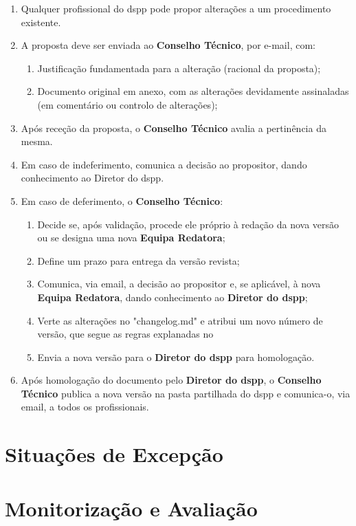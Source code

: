 \begin{enumerate}
  \item Qualquer profissional do \gls{dspp} pode propor alterações a um procedimento existente.
  \item A proposta deve ser enviada ao \textbf{Conselho Técnico}, por e-mail, com:
  \begin{enumerate}
    \item Justificação fundamentada para a alteração (racional da proposta);
    \item Documento original em anexo, com as alterações devidamente assinaladas (em comentário ou controlo de alterações);
  \end{enumerate}
  \item Após receção da proposta, o \textbf{Conselho Técnico} avalia a pertinência da mesma.
  \item Em caso de indeferimento, comunica a decisão ao propositor, dando conhecimento ao Diretor do \gls{dspp}.
  \item Em caso de deferimento, o \textbf{Conselho Técnico}:
  \begin{enumerate}
    \item Decide se, após validação, procede ele próprio à redação da nova versão ou se designa uma nova \textbf{Equipa Redatora};
    \item Define um prazo para entrega da versão revista;
    \item Comunica, via email, a decisão ao propositor e, se aplicável, à nova \textbf{Equipa Redatora}, dando conhecimento ao \textbf{Diretor do \gls{dspp}};
    \item Verte as alterações no "changelog.md" e atribui um novo número de versão, que segue as regras explanadas no 
    \item Envia a nova versão para o \textbf{Diretor do \gls{dspp}} para homologação.
  \end{enumerate}
  \item Após homologação do documento pelo \textbf{Diretor do \gls{dspp}}, o \textbf{Conselho Técnico} publica a nova versão na pasta partilhada do \gls{dspp} e comunica-o, via email, a todos os profissionais.
\end{enumerate}


\section{Situações de Excepção}\label{sec:situacoes-de-excepcao}


\section{Monitorização e Avaliação}\label{sec:monitorizacao-e-avaliacao}

